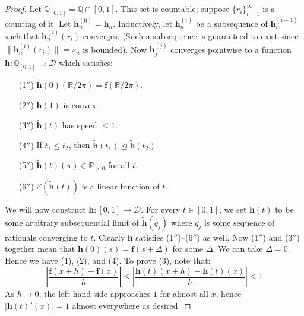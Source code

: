 \documentclass{amsart}
\newcommand{\R}			{\mathbb R}
\newcommand{\Q}			{\mathbb Q}
\newcommand{\f}			{\mathbf f}
\newcommand{\h}			{\mathbf h}
\newcommand{\map}		{\longrightarrow}
\numberwithin{equation}{section}
\begin{document}
\begin{proof}
Let $\Q_{[0,1]}=\Q\cap[0,1]$.  
This set is countable; suppose $\{r_i\}_{i=1}^\infty$ 
is a counting of it.  Let $\h_n^{(0)}=\h_n$.  
Inductively, let $\h_n^{(i)}$ be a subsequence of 
$\h_n^{(i-1)}$ such that $\h_n^{(i)}(r_i)$ converges.  
(Such a subsequence is guaranteed to exist since 
$\|\h_n^{(i)}(r_i)\|=s_n$ is bounded).  Now $\h_j^{(j)}$ 
converges pointwise to a function $\tilde{\h}:\Q_{[0,1]}\map\mathcal D$ 
which satisfies:
\begin{itemize}
\item[(1$''$)] $\tilde{\h}(0)(\R/2\pi)=\f(\R/2\pi)$.
\item[(2$''$)] $\tilde{\h}(1)$ is convex.
\item[(3$''$)] $\tilde{\h}(t)$ has speed $\leq 1$.
\item[(4$''$)] If $t_1\leq t_2$, then $\tilde{\h}(t_1)\trianglelefteq\tilde{\h}(t_2)$.
\item[(5$''$)] $\tilde{\h}(t)(\pi)\in\R_{>0}$ for all $t$.
\item[(6$''$)] $\mathcal E(\tilde{\h}(t))$ is a linear function of $t$.
\end{itemize}
We will now construct $\h:[0,1]\map\mathcal D$.  For every 
$t\in[0,1]$, we set $\h(t)$ to be some arbitrary subsequential 
limit of $\tilde{\h}(q_j)$ where $q_j$ is some sequence of 
rationals converging to $t$.  Clearly $\h$ satisfies 
(1$''$)--(6$''$) as well.  Now (1$''$) and (3$''$) together 
mean that $\h(0)(s)=\f(s+\Delta)$ for some 
$\Delta$.  We can take $\Delta=0$.  Hence we have 
(1), (2), and (4).  To prove (3), note that:
\begin{equation}
\left|\frac{\f(x+h)-\f(x)}h\right|\leq\left|\frac{\h(t)(x+h)-\h(t)(x)}h\right|\leq 1
\end{equation}
As $h\to 0$, the left hand side approaches $1$ for 
almost all $x$, hence $|\h(t)'(x)|=1$ almost 
everywhere as desired.


\end{proof}
\end{document}
